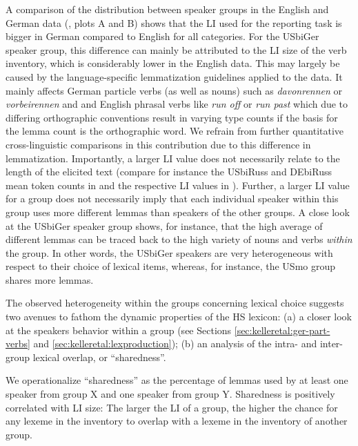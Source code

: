 \documentclass[output=paper,colorlinks,citecolor=brown]{langscibook}
\begin{document}
A comparison of the distribution between speaker groups in the English and German data (, plots A and B) shows that the LI used for the reporting task is bigger in German compared to English for all categories. For the USbiGer speaker group, this difference can mainly be attributed to the LI size of the verb inventory, which is considerably lower in the English data. This may largely be caused by the language-specific lemmatization guidelines applied to the data. It mainly affects German particle verbs (as well as nouns) such as \textit{davonrennen} or \textit{vorbeirennen} and and English phrasal verbs like \textit{run off} or \textit{run past} which due to differing orthographic conventions result in varying type counts if the basis for the lemma count is the orthographic word. We refrain from further quantitative cross-linguistic comparisons in this contribution due to this difference in lemmatization. Importantly, a larger LI value does not necessarily relate to the length of the elicited text (compare for instance the USbiRuss and DEbiRuss mean token counts in  and the respective LI values in ). Further, a larger LI value for a group does not necessarily imply that each individual speaker within this group uses more different lemmas than speakers of the other groups. A close look at the USbiGer speaker group shows, for instance, that the high average of different lemmas can be traced back to the high variety of nouns and verbs \textit{within} the group. In other words, the USbiGer speakers are very heterogeneous with respect to their choice of lexical items, whereas, for instance, the USmo group shares more lemmas.

The observed heterogeneity within the groups concerning lexical choice suggests two avenues to fathom the dynamic properties of the HS lexicon: (a) a closer look at the speakers behavior within a group (see Sections \ref{sec:kelleretal:ger-part-verbs} and \ref{sec:kelleretal:lexproduction}); (b) an analysis of the intra- and inter-group lexical overlap, or ``sharedness''.

We operationalize ``sharedness'' as the percentage of lemmas used by at least one speaker from group X and one speaker from group Y. Sharedness is positively correlated with LI size: The larger the LI of a group, the higher the chance for any lexeme in the inventory to overlap with a lexeme in the inventory of another group.
\end{document}
